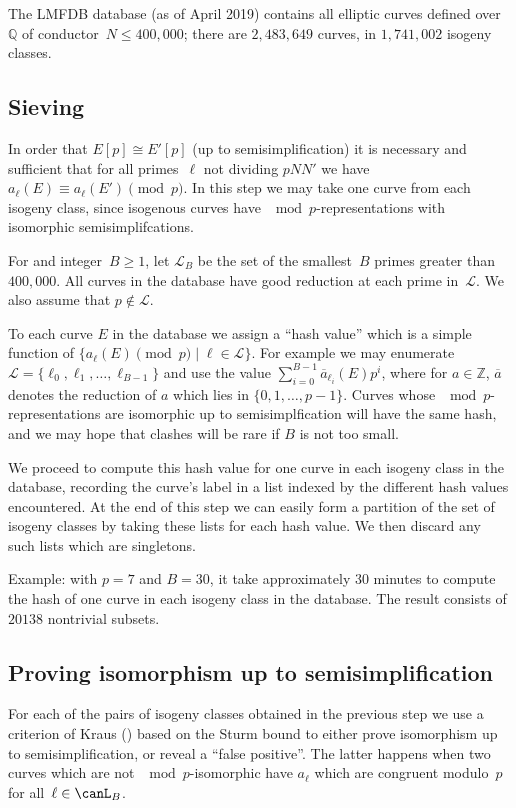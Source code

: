 \documentclass[12pt]{amsart}
\newcommand{\Q}{\mathbb{Q}}
\newcommand{\Z}{\mathbb{Z}}
\newcommand{\calL}{\mathcal{L}}
\numberwithin{equation}{section}
\theoremstyle{definition}
\theoremstyle{remark}
\begin{document}
The LMFDB database (as of April 2019) contains all elliptic curves
defined over~$\Q$ of conductor~$N\le400,000$; there are $2,483,649$
curves, in $1,741,002$ isogeny classes.

\subsection{Sieving}
In order that $E[p]\cong E'[p]$ (up to semisimplification) it is
necessary and sufficient that for all primes~$\ell$ not dividing
$pNN'$ we have $a_{\ell}(E)\equiv a_{\ell}(E')\pmod{p}$.  In this step
we may take one curve from each isogeny class, since isogenous curves
have $\mod{p}$-representations with isomorphic semisimplifcations.

For and integer~$B\ge1$, let $\calL_B$ be the set of the smallest~$B$
primes greater than $400,000$. All curves in the database have good
reduction at each prime in~$\calL$.  We also assume that
$p\notin\calL$.

To each curve $E$ in the database we assign a ``hash value'' which is
a simple function of $\{a_{\ell}(E)\pmod{p}\mid \ell\in\calL\}$.  For
example we may enumerate $\calL=\{\ell_0,\ell_1,\dots,\ell_{B-1}\}$
and use the value $\sum_{i=0}^{B-1}\overline{a}_{\ell_i}(E)p^i$, where
for $a\in\Z$, $\overline{a}$ denotes the reduction of $a$ which lies
in $\{0,1,\dots,p-1\}$.  Curves whose $\mod{p}$-representations are
isomorphic up to semisimplfication will have the same hash, and we may
hope that clashes will be rare if $B$ is not too small.

We proceed to compute this hash value for one curve in each isogeny
class in the database, recording the curve's label in a list indexed
by the different hash values encountered.  At the end of this step we
can easily form a partition of the set of isogeny classes by taking
these lists for each hash value.  We then discard any such lists which
are singletons.

Example: with $p=7$ and $B=30$, it take approximately 30 minutes to
compute the hash of one curve in each isogeny class in the database.
The result consists of $20138$ nontrivial subsets.  

\subsection{Proving isomorphism up to semisimplification}

For each of the pairs of isogeny classes obtained in the previous step
we use a criterion of Kraus (\cite{?}) based on the Sturm bound to
either prove isomorphism up to semisimplification, or reveal a ``false
positive''.  The latter happens when two curves which are not
$\mod{p}$-isomorphic have $a_{\ell}$ which are congruent modulo~$p$
for all~$\ell\in\canL_B$.
\end{document}
